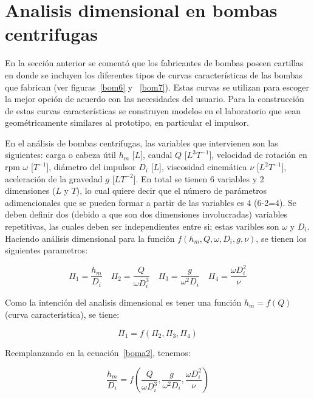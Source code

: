 \documentclass[11pt, oneside]{article}
\begin{document}
\section{Analisis dimensional en bombas centrifugas}
En la secci\'on anterior se coment\'o que los fabricantes de bombas poseen cartillas en donde se incluyen los diferentes tipos de curvas caracter\'isticas de las bombas que fabrican (ver figuras~\ref{bom6} y ~\ref{bom7}). Estas curvas se utilizan  para escoger la mejor opci\'on de acuerdo con las necesidades del usuario. Para la construcci\'on de estas curvas caracter\'isticas se construyen modelos en el laboratorio que sean geom\'etricamente similares al prototipo, en particular el impulsor.

En el an\'alisis de bombas centrifugas, las variables que intervienen son las siguientes: carga o cabeza \'util $h_m$ [$L$], caudal $Q$ [$L^3 T^{-1}$], velocidad de rotaci\'on en rpm $\omega$ [$T^{-1}$], di\'ametro del impulsor $D_i$ [$L$], viscosidad cinem\'atica $\nu$ [$L^2 T^{-1}$], aceleraci\'on de la gravedad $g$ [$L T^{-2}$]. En total se tienen 6 variables y 2 dimensiones ($L$ y $T$), lo cual quiere decir que el n\'umero de par\'ametros adimencionales que se pueden formar a partir de las variables es 4 (6-2=4). Se deben definir dos  (debido a que son dos dimensiones involucradas) variables repetitivas, las cuales deben ser independientes entre si; estas varibles son $\omega$ y $D_i$. Haciendo an\'alisis dimensional para la funci\'on $f(h_m, Q, \omega, D_i, g, \nu)$, se tienen los siguientes parametros:

\begin{equation}
\Pi_1 = \frac{h_m}{D_i} \quad  \Pi_2 = \frac{Q}{\omega D_i^3} \quad \Pi_3 = \frac{g}{\omega^2 D_i} \quad \Pi_4 = \frac{\omega D_i^2}{\nu}
\label{boma1}
\end{equation}

Como la intenci\'on del analisis dimensional es tener una funci\'on $h_m = f(Q)$ (curva caracter\'istica), se tiene:

\begin{equation}
\Pi_1 =f\left(\Pi_2, \Pi_3, \Pi_4 \right) 
\label{boma2}
\end{equation}

Reemplanzando en la ecuaci\'on~\ref{boma2}, tenemos:

\begin{equation}
\frac{h_m}{D_i} = f\left( \frac{Q}{\omega D_i^3}, \frac{g}{\omega^2 D_i} , \frac{\omega D_i^2}{\nu} \right)
\label{boma3}
\end{equation}
\end{document}
